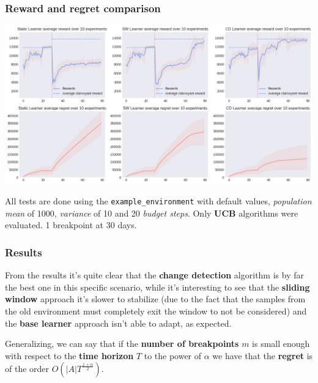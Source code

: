 \begin{frame}
\frametitle{Reward and regret comparison}

\begin{center}
    \includegraphics[scale=0.32]{img/Graphs/non_stationary/image4.png}
\end{center}

\scriptsize All tests are done using the \texttt{example\_environment} with default values, \textit{population mean} of 1000, \textit{variance} of 10 and 20 \textit{budget steps}. Only \textbf{UCB} algorithms were evaluated. 1 breakpoint at 30 days.

\end{frame}


\begin{frame}
\frametitle{Results}

From the results it's quite clear that the \textbf{change detection} algorithm is by far the best one in this specific scenario, while it's interesting to see that the \textbf{sliding window} approach it's slower to stabilize (due to the fact that the samples from the old environment must completely exit the window to not be considered) and the \textbf{base learner} approach isn't able to adapt, as expected.

Generalizing, we can say that if the \textbf{number of breakpoints} $m$ is small enough with respect to the \textbf{time horizon} $T$ to the power of $\alpha$ we have that the \textbf{regret} is of the order $O\left( \vert A \vert T^{\frac{1+\alpha}{2}} \right)$.

\end{frame}


